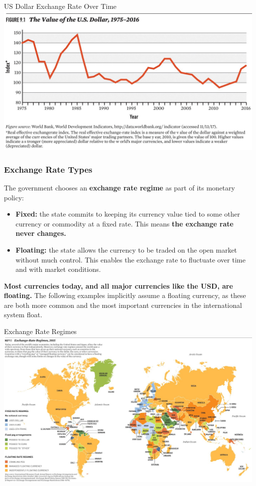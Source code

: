 \documentclass[handout]{beamer}
\begin{document}
\begin{frame}{\LARGE US Dollar Exchange Rate Over Time}
	\centering
	\includegraphics[width=\textwidth,height=0.8\textheight,keepaspectratio]{USXR.jpg}
\end{frame}

\begin{frame} 
	\frametitle{\LARGE{Exchange Rate Types}}
	The government chooses an \textbf{exchange rate regime} as part of its monetary policy:  \pause
	\begin{itemize}
		\item \textbf{Fixed:} the state commits to keeping its currency value tied to some other currency or commodity at a fixed rate. This means \textbf{the exchange rate never changes.} \pause 
		\item \textbf{Floating:} the state allows the currency to be traded on the open market without much control. This enables the exchange rate to fluctuate over time and with market conditions. \pause
	\end{itemize}
	\textbf{Most currencies today, and all major currencies like the USD, are floating.} The following examples implicitly assume a floating currency, as these are both more common and the most important currencies in the international system float.
\end{frame}

\begin{frame}{\LARGE Exchange Rate Regimes}
	\centering
	\includegraphics[width=\textwidth,height=0.8\textheight,keepaspectratio]{exchange rate regimes.jpg}
\end{frame}
\end{document}
